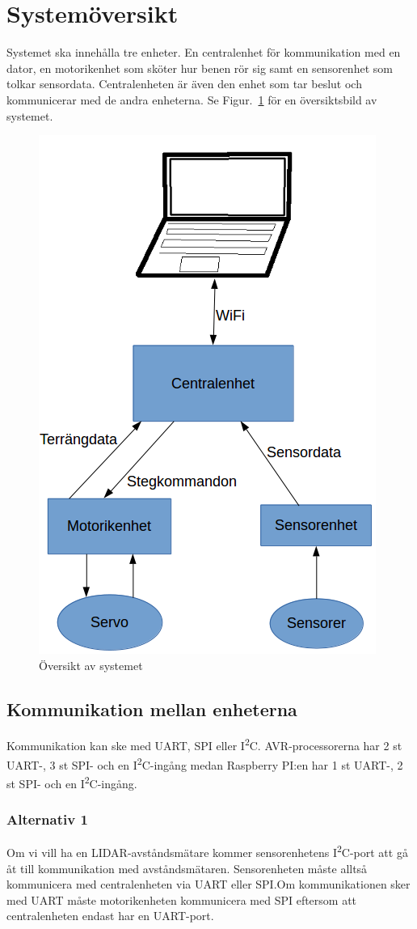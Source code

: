 \documentclass[a4paper,titlepage,12pt]{article}
\newcommand{\itc}{I\textsuperscript{2}C}
\begin{document}
	\section{Systemöversikt}
	Systemet ska innehålla tre enheter. En centralenhet för kommunikation med en
	dator, en motorikenhet som sköter hur benen rör sig samt en sensorenhet som
	tolkar sensordata. Centralenheten är även den enhet som tar beslut och
	kommunicerar med de andra enheterna. Se Figur.~\ref{fig:overview} för en översiktsbild av
	systemet.
	\begin{figure}[h]
		\centering
		\includegraphics[width=0.5\linewidth]{../images/overview.png}
		\caption{Översikt av systemet\label{fig:overview}}
	\end{figure}

	\subsection{Kommunikation mellan enheterna}
	Kommunikation kan ske med UART, SPI eller \itc{}. AVR-processorerna har
	2 st UART-, 3 st SPI- och en \itc{}-ingång medan Raspberry PI:en har 1 st
	UART-, 2 st SPI- och
	en \itc{}-ingång. 

	\subsubsection{Alternativ 1}
	Om vi vill ha en LIDAR-avståndsmätare kommer sensorenhetens \itc{}-port att gå åt
	till kommunikation med avståndsmätaren. Sensorenheten måste alltså kommunicera med
	centralenheten via UART eller SPI.\@ Om kommunikationen sker med UART måste 
	motorikenheten kommunicera med SPI eftersom att centralenheten endast har en
	UART-port.
\end{document}
